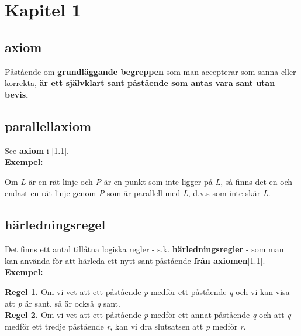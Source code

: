 \section{Kapitel 1} 
\subsection{\textbf{axiom}}\label{axiom} 
    \textbf{\cite{axiom}}Påstående om \textbf{grundläggande begreppen} som man accepterar som sanna eller korrekta, \textbf{är ett självklart sant påstående som antas vara sant utan bevis.}
\subsection{\textbf{parallellaxiom}}\label{parallellaxiom} 
    See \textbf{axiom} i [\ref{axiom}].
    \\\textbf{Exempel:}
    \vspace{3 mm}
    \begin{adjustwidth}{10 mm}{10 mm}
        Om \textsl{L} är en rät linje och \textsl{P} är en punkt som inte ligger på \textsl{L}, så finns det en och endast en rät linje genom \textsl{P} som är parallell med \textsl{L}, d.v.s som inte skär \textsl{L}.
    \end{adjustwidth}
    \vspace{3 mm}
\subsection{\textbf{härledningsregel}}\label{härledningsregel}
    \textbf{\cite{härledningsregel}}Det finns ett antal tillåtna logiska regler - s.k. \textbf{härledningsregler} - som man kan använda för att härleda ett nytt sant påstående \textbf{från axiomen}[\ref{axiom}].
    \\\textbf{Exempel:}
    \vspace{3 mm}
    \begin{adjustwidth}{10 mm}{10 mm}
        \textbf{Regel 1.} Om vi vet att ett påstående \textsl{p} medför ett påstående \textsl{q} och vi kan visa att \textsl{p} är sant, så är också \textsl{q} sant.
        \\\textbf{Regel 2.} Om vi vet att ett påstående \textsl{p} medför ett annat påstående \textsl{q} och att \textsl{q} medför ett tredje påstående \textsl{r}, kan vi dra slutsatsen att \textsl{p} medför \textsl{r}.
    \end{adjustwidth}
    \vspace{3 mm}
